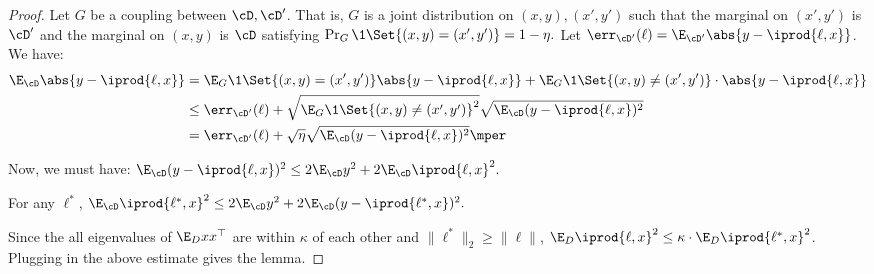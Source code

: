 \begin{proof}
Let $G$ be a coupling between $\cD,\cD'$. That is, $G$ is a joint distribution on $(x,y), (x',y')$ such that the marginal on $(x',y')$ is $\cD'$ and the marginal on $(x,y)$ is $\cD$ satisfying $\Pr_G \1 \Set{ (x,y) = (x',y')} = 1-\eta.$ 
Let $\err_{\cD'}(\ell) = \E_{\cD'} \abs{y-\iprod{\ell,x}}$.
We have: 
\begin{align*}
\E_{\cD}  \abs{y-\iprod{\ell,x}} &= \E_G \1 \Set{ (x,y) = (x',y')} \abs{y-\iprod{\ell,x}} + \E_{G} \1 \Set{ (x,y) \neq (x',y')} \cdot \abs{y-\iprod{\ell,x}}\\
&\leq \err_{\cD'}(\ell) + \sqrt{\E_{G}\1 \Set{ (x,y) \neq (x',y')}^2} \sqrt{ \E_{\cD} (y-\iprod{\ell,x})^2}\\
&= \err_{\cD'}(\ell) + \sqrt{\eta} \sqrt{\E_{\cD} (y-\iprod{\ell,x})^2}\mper
\end{align*}

Now, we must have: $\E_{\cD} (y - \iprod{\ell,x})^2 \leq 2 \E_{\cD} y^2 + 2 \E_{\cD} \iprod{\ell,x}^2.$

For any $\ell^{*}$, $\E_{\cD} \iprod{\ell^{*},x}^2 \leq 2\E_{\cD} y^2 + 2\E_{\cD} (y-\iprod{\ell^{*},x})^2.$   

Since the all eigenvalues of $\E_{D} xx^{\top}$ are within $\kappa$ of each other and $\|\ell^{*}\|_2 \geq \|\ell\|$, $\E_{D} \iprod{\ell,x}^2 \leq \kappa \cdot \E_{D} \iprod{\ell^{*},x}^2$. Plugging in the above estimate gives the lemma.












\end{proof}



